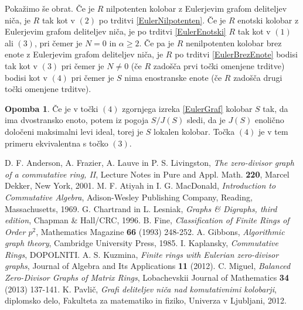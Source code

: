 \documentclass[a4paper, 12pt]{amsart}
\theoremstyle{definition} %
\newtheorem{opomba}[definicija]{Opomba}
\theoremstyle{plain} %
\begin{document}
Pokažimo še obrat. 
Če je $R$ nilpotenten kolobar z Eulerjevim grafom deliteljev niča, je $R$ tak kot v $(2)$ po trditvi \ref{EulerNilpotenten}. Če je $R$ enotski kolobar z Eulerjevim grafom deliteljev niča, je po trditvi \ref{EulerEnotski} $R$ tak kot v $(1)$ ali $(3)$, pri čemer je $N=0$ in $\alpha \ge 2$. Če pa je $R$ nenilpotenten kolobar brez enote z Eulerjevim grafom deliteljev niča, je $R$ po trditvi \ref{EulerBrezEnote} bodisi tak kot v $(3)$ pri čemer je $N\neq 0$ (če $R$ zadošča prvi točki omenjene trditve) bodisi kot v $(4)$ pri čemer je $S$ nima enostranske enote (če $R$ zadošča drugi točki omenjene trditve). 

\endproof

\begin{opomba}
Če je v točki $(4)$ zgornjega izreka \ref{EulerGraf} kolobar $S$ tak, da ima dvostransko enoto, potem iz pogoja $S/J(S)$ sledi, da je $J(S)$ enolično določeni maksimalni levi ideal, torej je $S$ lokalen kolobar. Točka $(4)$  je v tem primeru ekvivalentna s točko $(3)$.
\end{opomba}

\begin{thebibliography}{99}
 D. F. Anderson, A. Frazier, A. Lauve in P. S. Livingston, \emph{The zero-divisor graph of a commutative ring, II}, Lecture Notes in Pure and Appl. Math. {\bf 220}, Marcel Dekker, New York, 2001.
M. F. Atiyah in I. G. MacDonald, \emph{Introduction to Commutative Algebra}, Adison-Wesley Publishing Company, Reading, Massachusetts, 1969.
G. Chartrand in L. Lesniak, \emph{Graphs \& Digraphs, third edition}, Chapman \& Hall/CRC,  1996.
B. Fine, \emph{Classification of Finite Rings of Order $p^2$}, Mathematics Magazine {\bf 66} (1993) 248-252. 
A. Gibbons, \emph{Algorithmic graph theory}, Cambridge University Press, 1985.
I. Kaplansky, \emph{Commutative Rings}, DOPOLNITI.
A. S. Kuzmina, \emph{Finite rings with Eulerian zero-divisor graphs}, Journal of Algebra and Its Applications {\bf 11} (2012).
C. Miguel, \emph{Balanced Zero-Divisor Graphs of Matrix Rings}, Lobachevskii Journal of Mathematics {\bf 34} (2013) 137-141.
K. Pavlič, \emph{Grafi deliteljev niča nad komutativnimi kolobarji}, diplomsko delo, Fakulteta za matematiko in fiziko, Univerza v Ljubljani, 2012.
\end{thebibliography}
\end{document}
